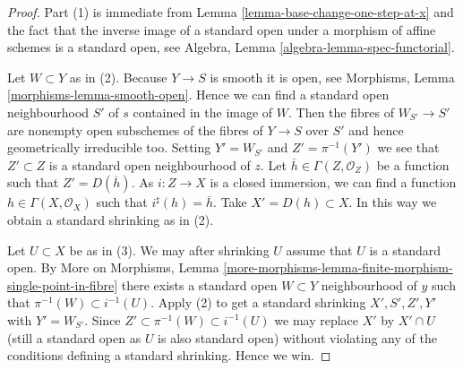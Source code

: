 \documentclass[10pt,a4paper]{amsart}
\theoremstyle{plain}
\theoremstyle{definition}
\theoremstyle{remark}
\numberwithin{equation}{subsection}
\begin{document}
\begin{proof}
Part (1) is immediate from
Lemma \ref{lemma-base-change-one-step-at-x}
and the fact that the inverse image of a standard open under a morphism
of affine schemes is a standard open, see
Algebra, Lemma \ref{algebra-lemma-spec-functorial}.

\medskip\noindent
Let $W \subset Y$ as in (2). Because $Y \to S$ is smooth it is open, see
Morphisms, Lemma \ref{morphisms-lemma-smooth-open}.
Hence we can find a standard open neighbourhood $S'$ of $s$
contained in the image of $W$. Then the fibres of $W_{S'} \to S'$
are nonempty open subschemes of the fibres of $Y \to S$ over $S'$
and hence geometrically irreducible too. Setting $Y' = W_{S'}$
and $Z' = \pi^{-1}(Y')$ we see that $Z' \subset Z$ is a standard open
neighbourhood of $z$. Let $\overline{h} \in \Gamma(Z, \mathcal{O}_Z)$
be a function such that $Z' = D(\overline{h})$. As $i : Z \to X$
is a closed immersion, we can find a function $h \in \Gamma(X, \mathcal{O}_X)$
such that $i^\sharp(h) = \overline{h}$. Take $X' = D(h) \subset X$.
In this way we obtain a standard shrinking as in (2).

\medskip\noindent
Let $U \subset X$ be as in (3). We may after shrinking $U$ assume that
$U$ is a standard open. By
More on Morphisms,
Lemma \ref{more-morphisms-lemma-finite-morphism-single-point-in-fibre}
there exists a standard open $W \subset Y$ neighbourhood of $y$ such
that $\pi^{-1}(W) \subset i^{-1}(U)$. Apply (2) to get a standard
shrinking $X', S', Z', Y'$ with $Y' = W_{S'}$. Since
$Z' \subset \pi^{-1}(W) \subset i^{-1}(U)$ we may replace $X'$ by
$X' \cap U$ (still a standard open as $U$ is also standard open)
without violating any of the conditions defining a standard shrinking.
Hence we win.
\end{proof}
\end{document}
